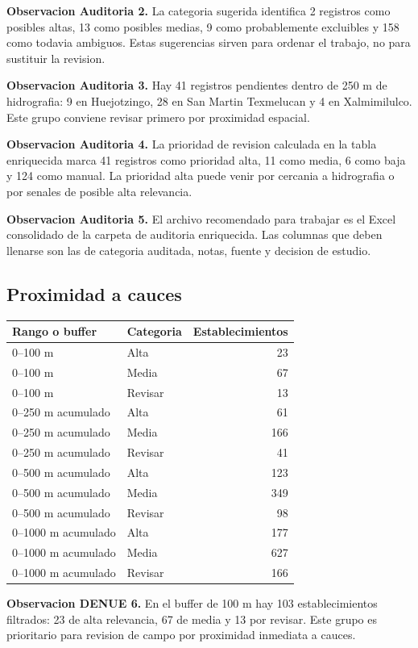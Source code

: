 \documentclass[11pt,letterpaper]{article}
\begin{document}
\textbf{Observacion Auditoria 2.} La categoria sugerida identifica 2 registros como posibles altas, 13 como posibles medias, 9 como probablemente excluibles y 158 como todavia ambiguos. Estas sugerencias sirven para ordenar el trabajo, no para sustituir la revision.

\textbf{Observacion Auditoria 3.} Hay 41 registros pendientes dentro de 250 m de hidrografia: 9 en Huejotzingo, 28 en San Martin Texmelucan y 4 en Xalmimilulco. Este grupo conviene revisar primero por proximidad espacial.

\textbf{Observacion Auditoria 4.} La prioridad de revision calculada en la tabla enriquecida marca 41 registros como prioridad alta, 11 como media, 6 como baja y 124 como manual. La prioridad alta puede venir por cercania a hidrografia o por senales de posible alta relevancia.

\textbf{Observacion Auditoria 5.} El archivo recomendado para trabajar es el Excel consolidado de la carpeta de auditoria enriquecida. Las columnas que deben llenarse son las de categoria auditada, notas, fuente y decision de estudio.

\subsection{Proximidad a cauces}

\begin{longtable}{p{4cm}p{2.6cm}r}
\toprule
Rango o buffer & Categoria & Establecimientos \\
\midrule
0--100 m & Alta & 23 \\
0--100 m & Media & 67 \\
0--100 m & Revisar & 13 \\
0--250 m acumulado & Alta & 61 \\
0--250 m acumulado & Media & 166 \\
0--250 m acumulado & Revisar & 41 \\
0--500 m acumulado & Alta & 123 \\
0--500 m acumulado & Media & 349 \\
0--500 m acumulado & Revisar & 98 \\
0--1000 m acumulado & Alta & 177 \\
0--1000 m acumulado & Media & 627 \\
0--1000 m acumulado & Revisar & 166 \\
\bottomrule
\end{longtable}

\textbf{Observacion DENUE 6.} En el buffer de 100 m hay 103 establecimientos filtrados: 23 de alta relevancia, 67 de media y 13 por revisar. Este grupo es prioritario para revision de campo por proximidad inmediata a cauces.
\end{document}
